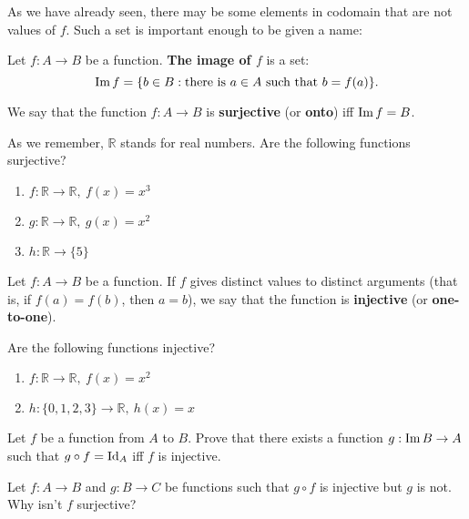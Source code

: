 \noindent As we have already seen, there may be some elements in codomain that are not values of $f$. Such a set is important enough to be given a name:

\begin{definition}
  Let $f:A\to B$ be a function. \textbf{The image of $f$} is a set:
  $$\text{Im}\, f=\{b\in B : \text{there is } a\in A \text{ such that } b=f(a)\}.$$

  We say that the function $f: A\to B$ is \textbf{surjective} (or \textbf{onto}) iff $\text{Im}\, f=B$.
\end{definition}

\begin{prob}
	As we remember, $\mathbb{R}$ stands for real numbers. Are the following functions surjective?
	\begin{enumerate}
		\item $f: \mathbb{R} \to \mathbb{R}, ~f(x)=x^3$
		\item $g: \mathbb{R} \to \mathbb{R}, ~g(x)=x^2$
		\item $h: \mathbb{R} \to \{5\}$
	\end{enumerate}
\end{prob}

\begin{definition}
  Let $f:A\to B$ be a function. If $f$ gives distinct values to distinct arguments (that is, if $f(a)=f(b)$, then $a=b$), we say that the function is \textbf{injective}
  (or \textbf{one-to-one}).
\end{definition}

\begin{exercise}
  Are the following functions injective?
	\begin{enumerate}
		\item $f: \mathbb{R} \to \mathbb R, ~f(x)=x^2$
		\item $h: \{0,1,2,3\} \to \mathbb R, ~h(x)=x$
	\end{enumerate}
\end{exercise}

\begin{exercise}
	Let $f$ be a function from $A$ to $B$. Prove that there exists a function $g: \text{Im}\, B\to A$ such that $g\circ f=\text{Id}_A$ iff $f$ is injective.
\end{exercise}

\begin{exercise}
	Let $f: A\to B$ and $g: B\to C$ be functions such that $g\circ f$ is injective but $g$ is not. Why isn't $f$ surjective?
\end{exercise}

